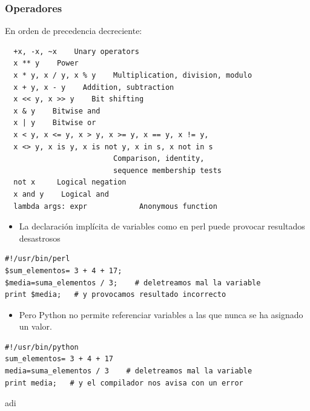 \documentclass{beamer}
\begin{document}
\begin{frame}[fragile]
  \begin{center}
\frametitle{Operadores }
En orden de precedencia decreciente:
  \end{center}
  

  \begin{footnotesize}
\begin{verbatim}
  +x, -x, ~x    Unary operators
  x ** y    Power 
  x * y, x / y, x % y    Multiplication, division, modulo
  x + y, x - y    Addition, subtraction
  x << y, x >> y    Bit shifting
  x & y    Bitwise and
  x | y    Bitwise or
  x < y, x <= y, x > y, x >= y, x == y, x != y,
  x <> y, x is y, x is not y, x in s, x not in s  
                         Comparison, identity, 
                         sequence membership tests
  not x     Logical negation
  x and y    Logical and
  lambda args: expr            Anonymous function
\end{verbatim}
  \end{footnotesize}

\end{frame}

\begin{frame}[fragile]

\begin{itemize}
  
\item 
La declaración implícita de variables como en perl puede provocar resultados desastrosos
\end{itemize}

\begin{footnotesize}
\begin{verbatim}
#!/usr/bin/perl
$sum_elementos= 3 + 4 + 17;
$media=suma_elementos / 3;    # deletreamos mal la variable
print $media;   # y provocamos resultado incorrecto
\end{verbatim}
\end{footnotesize}

\begin{itemize}
\item 
Pero Python no permite referenciar variables a las que nunca se ha
asignado un valor.
\end{itemize}
\begin{footnotesize}
\begin{verbatim}
#!/usr/bin/python
sum_elementos= 3 + 4 + 17
media=suma_elementos / 3    # deletreamos mal la variable
print media;   # y el compilador nos avisa con un error
\end{verbatim}
\end{footnotesize}
adi

\end{frame}
\end{document}
